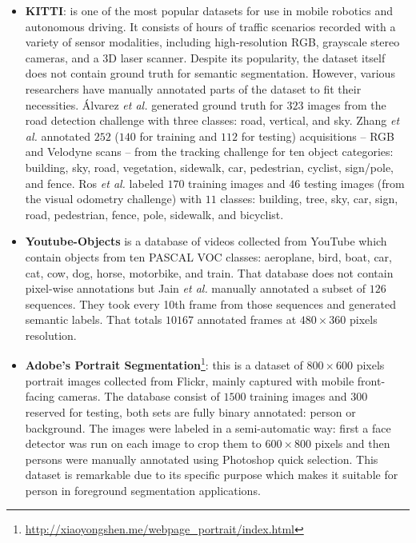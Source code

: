 \begin{itemize}
	\item \textbf{KITTI}\cite{Geiger2013}: is one of the most popular datasets for use in mobile robotics and autonomous driving. It consists of hours of traffic scenarios recorded with a variety of sensor modalities, including high-resolution RGB, grayscale stereo cameras, and a 3D laser scanner. Despite its popularity, the dataset itself does not contain ground truth for semantic segmentation. However, various researchers have manually annotated parts of the dataset to fit their necessities. Álvarez \emph{et al.}\cite{Alvarez2012}\cite{Ros2015a} generated ground truth for $323$ images from the road detection challenge with three classes: road, vertical, and sky. Zhang \emph{et al.}\cite{Zhang2015} annotated $252$ ($140$ for training and $112$ for testing) acquisitions -- RGB and Velodyne scans -- from the tracking challenge for ten object categories: building, sky, road, vegetation, sidewalk, car, pedestrian, cyclist, sign/pole, and fence. Ros \emph{et al.} \cite{Ros2015} labeled $170$ training images and $46$ testing images (from the visual odometry challenge) with $11$ classes: building, tree, sky, car, sign, road, pedestrian, fence, pole, sidewalk, and bicyclist.
	\item \textbf{Youtube-Objects}\cite{Prest2012} is a database of videos collected from YouTube which contain objects from ten PASCAL \acs{VOC} classes: aeroplane, bird, boat, car, cat, cow, dog, horse, motorbike, and train. That database  does not contain pixel-wise annotations but Jain \emph{et al.}\cite{Jain2014} manually annotated a subset of $126$ sequences. They took every 10th frame from those sequences and generated semantic labels. That totals  $10167$ annotated frames at $480\times360$ pixels resolution.
	\item \textbf{Adobe's Portrait Segmentation}\cite{Shen2016}\footnote{\url{http://xiaoyongshen.me/webpage_portrait/index.html}}: this is a dataset of $800\times600$ pixels portrait images collected from Flickr, mainly captured with mobile front-facing cameras. The database consist of $1500$ training images and $300$ reserved for testing, both sets are fully binary annotated: person or background. The images were labeled in a semi-automatic way: first a face detector was run on each image to crop them to $600\times800$ pixels and then persons were manually annotated using Photoshop quick selection. This dataset is remarkable due to its specific purpose which makes it suitable for person in foreground segmentation applications.

\end{itemize}
